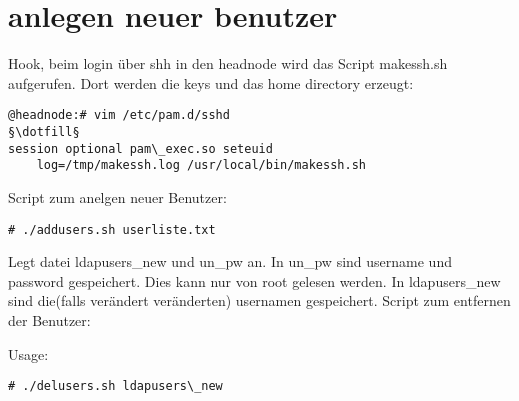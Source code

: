 \section{anlegen neuer benutzer}
Hook, beim login über shh in den headnode wird das Script makessh.sh aufgerufen.
Dort werden die keys und das home directory erzeugt:
\begin{lstlisting}[style=Bash]
@headnode:# vim /etc/pam.d/sshd
§\dotfill§
session optional pam\_exec.so seteuid 
    log=/tmp/makessh.log /usr/local/bin/makessh.sh
\end{lstlisting}
Script zum anelgen neuer Benutzer:

\begin{lstlisting}[style=Bash]
# ./addusers.sh userliste.txt 
\end{lstlisting}
Legt datei ldapusers\_new und un\_pw an.
In un\_pw sind username und password gespeichert. Dies kann nur von root gelesen werden. In ldapusers\_new sind die(falls verändert veränderten) usernamen gespeichert.
Script zum entfernen der Benutzer:

Usage:
\begin{lstlisting}[style=Bash]
# ./delusers.sh ldapusers\_new
\end{lstlisting}

